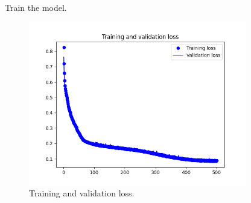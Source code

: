 \begin{frame}
    \begin{listing}[H]
        \caption{Train the model.}
        \label{lst:tflite:sinewave:train}
    \end{listing}
\end{frame}

\begin{frame}
    \begin{figure}
        \includegraphics[width=0.85\textwidth]{images/tflite/colab/history.png}
        \caption{Training and validation loss.}
    \end{figure}
\end{frame}